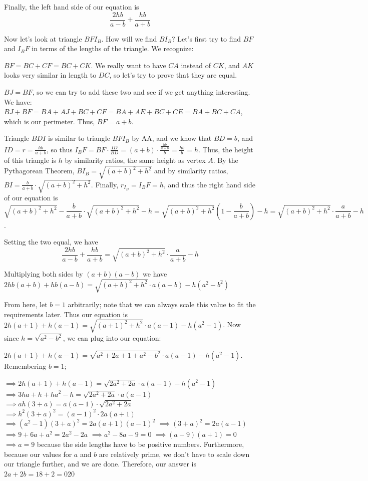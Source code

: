\begin{enumerate}
 Finally, the left hand side of our equation is 
 \[\frac{2hb}{a-b} + \frac{hb}{a+b}\]

 Now let's look at triangle $BFI_B$. How will we find $BI_B$? Let's first try to find $BF$ and $I_BF$ in terms of the lengths of the triangle. We recognize:

 $BF = BC + CF = BC + CK$. We really want to have $CA$ instead of $CK$, and $AK$ looks very similar in length to $DC$, so let's try to prove that they are equal. 

 $BJ = BF$, so we can try to add these two and see if we get anything interesting. We have:$BJ + BF = BA + AJ + BC + CF = BA + AE + BC + CE = BA + BC + CA$, which is our perimeter. Thus, $BF = a+b$.

 Triangle $BDI$ is similar to triangle $BFI_B$ by AA, and we know that $BD = b$, and $ID = r = \frac{hb}{a+b}$, so thus $I_BF = BF \cdot \frac{ID}{BD} = (a+b) \cdot \frac{\frac{hb}{a+b}}{b} = \frac{hb}{b} = h$. Thus, the height of this triangle is $h$ by similarity ratios, the same height as vertex $A$. By the Pythagorean Theorem, $BI_B = \sqrt{(a+b)^2 + h^2}$ and by similarity ratios, $BI = \frac{b}{a+b} \cdot \sqrt{(a+b)^2 + h^2}$. Finally, $r_{I_B} = I_BF = h$, and thus the right hand side of our equation is 
 \[\sqrt{(a+b)^2 + h^2} - \frac{b}{a+b} \cdot \sqrt{(a+b)^2 + h^2} - h = \sqrt{(a+b)^2 + h^2}(1 - \frac{b}{a+b}) - h = \sqrt{(a+b)^2 + h^2} \cdot \frac{a}{a+b} - h\].

 Setting the two equal, we have 
 \[\frac{2hb}{a-b} + \frac{hb}{a+b} = \sqrt{(a+b)^2 + h^2} \cdot \frac{a}{a+b} - h\]

 Multiplying both sides by $(a+b)(a-b)$ we have $2hb(a+b) + hb(a-b) = \sqrt{(a+b)^2 + h^2} \cdot a(a-b) - h(a^2 - b^2)$

 From here, let $b = 1$ arbitrarily; note that we can always scale this value to fit the requirements later. Thus our equation is $2h(a+1) + h(a-1) = \sqrt{(a+1)^2 + h^2} \cdot a(a-1) - h(a^2 - 1)$. Now since $h = \sqrt{a^2 - b^2}$, we can plug into our equation:

 $2h(a+1) + h(a-1) = \sqrt{a^2 + 2a + 1 + a^2 - b^2 } \cdot a(a-1) - h(a^2 - 1)$. Remembering $b = 1$;

 $\implies 2h(a+1) + h(a-1) = \sqrt{2a^2 + 2a} \cdot a(a-1) - h(a^2 - 1)$
$\implies 3ha + h + ha^2 - h = \sqrt{2a^2 + 2a} \cdot a(a-1)$
$\implies ah(3+a) = a(a-1) \cdot \sqrt{2a^2 + 2a}$
$\implies h^2(3+a)^2 = (a-1)^2 \cdot 2a(a+1)$
$\implies (a^2 - 1) (3 + a)^2 = 2a(a+1)(a - 1)^2$
$\implies (3+ a)^2 = 2a(a-1)$
$\implies 9 + 6a + a^2 = 2a^2 - 2a$
$\implies a^2 - 8a - 9 = 0$
$\implies (a-9)(a+1) = 0$
$\implies a = 9$ because the side lengths have to be positive numbers. Furthermore, because our values for $a$ and $b$ are relatively prime, we don't have to scale down our triangle further, and we are done. Therefore, our answer is $2a + 2b = 18 + 2 = \boxed{020}$





\end{enumerate}
